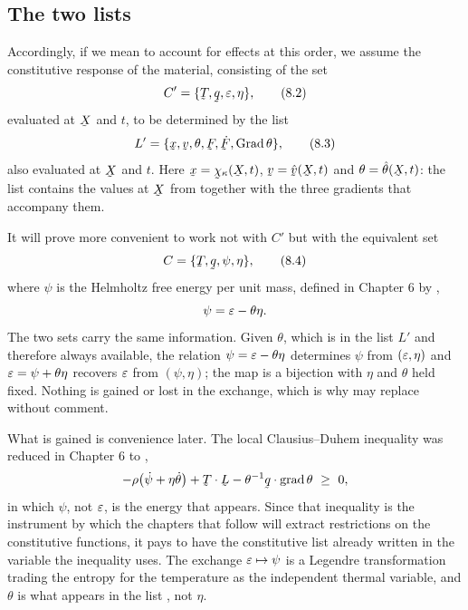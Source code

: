 \subsection*{The two lists}

Accordingly, if we mean to account for effects at this order, we assume
the constitutive response of the material, consisting of the set
\begin{equation}
   C'=\{\bT,\bq,\eps,\eta\},
   \tag{8.2}\label{eq:8.2}
\end{equation}
evaluated at $\bX$ and $t$, to be determined by the list
\begin{equation}
   L'=\{\bx,\bv,\theta,\bF,\dot\bF,\Grad\theta\},
   \tag{8.3}\label{eq:8.3}
\end{equation}
also evaluated at $\bX$ and $t$. Here $\bx=\bchi_{\kappa}(\bX,t)$,
$\bv=\hat\bv(\bX,t)$ and $\theta=\hat\theta(\bX,t)$: the list contains
the values at $\bX$ from  together with the three gradients
that accompany them.

It will prove more convenient to work not with $C'$ but with the
equivalent set
\begin{equation}
   C=\{\bT,\bq,\psi,\eta\},
   \tag{8.4}\label{eq:8.4}
\end{equation}
where $\psi$ is the Helmholtz free energy per unit mass, defined in
Chapter 6 by ,
\[
   \psi=\varepsilon-\theta\eta .
\]
The two sets carry the same information. Given $\theta$, which is in the
list $L'$ and therefore always available, the relation
$\psi=\varepsilon-\theta\eta$ determines $\psi$ from $(\varepsilon,\eta)$ and
$\varepsilon=\psi+\theta\eta$ recovers $\varepsilon$ from $(\psi,\eta)$; the map is a
bijection with $\eta$ and $\theta$ held fixed. Nothing is gained or lost
in the exchange, which is why  may replace  without
comment.

What is gained is convenience later. The local Clausius--Duhem
inequality was reduced in Chapter 6 to ,
\[
   -\rho\big(\dot\psi+\eta\dot\theta\big)+\ip\bT\bL
   -\theta^{-1}\ip\bq{\grad\theta}\ \geq\ 0 ,
\]
in which $\psi$, not $\varepsilon$, is the energy that appears. Since that
inequality is the instrument by which the chapters that follow will
extract restrictions on the constitutive functions, it pays to have the
constitutive list already written in the variable the inequality uses.
The exchange $\varepsilon\mapsto\psi$ is a Legendre transformation trading the
entropy for the temperature as the independent thermal variable, and
$\theta$ is what appears in the list , not $\eta$.

